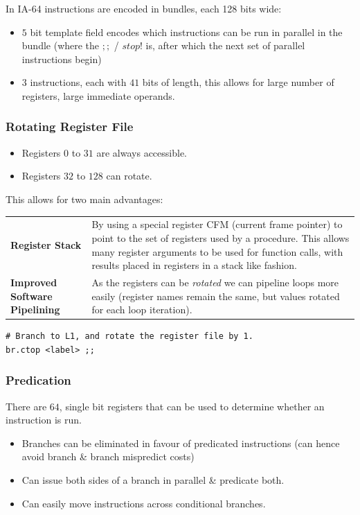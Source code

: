 In IA-64 instructions are encoded in bundles, each 128 bits wide:
\begin{itemize}
    \item $5$ bit template field encodes which instructions can be run in parallel in the bundle (where the $;;$ / $stop!$ is, after which the next set of parallel instructions begin)
    \item $3$ instructions, each with $41$ bits of length, this allows for large number of registers, large immediate operands.
\end{itemize}
\subsubsection{Rotating Register File}
\begin{itemize}
    \item Registers $0$ to $31$ are always accessible.
    \item Registers $32$ to $128$ can rotate.
\end{itemize}
This allows for two main advantages:
\begin{center}
    \begin{tabular}{p{} p{}}
        \textbf{Register Stack} & By using a special register CFM (current frame pointer) to point to the set of registers used by a procedure. This allows many register arguments to be used for function calls, with results placed in registers in a stack like fashion. \\
        \textbf{Improved \newline Software Pipelining} & As the registers can be \textit{rotated} we can pipeline loops more easily (register names remain the same, but values rotated for each loop iteration). \\
    \end{tabular}
\end{center}
\begin{verbatim}
# Branch to L1, and rotate the register file by 1.
br.ctop <label> ;;
\end{verbatim}

\subsubsection{Predication}
There are $64$, single bit registers that can be used to determine whether an instruction is run.
\begin{itemize}
    \item Branches can be eliminated in favour of predicated instructions (can hence avoid branch \& branch mispredict costs)
    \item Can issue both sides of a branch in parallel \& predicate both.
    \item Can easily move instructions across conditional branches.
\end{itemize}


